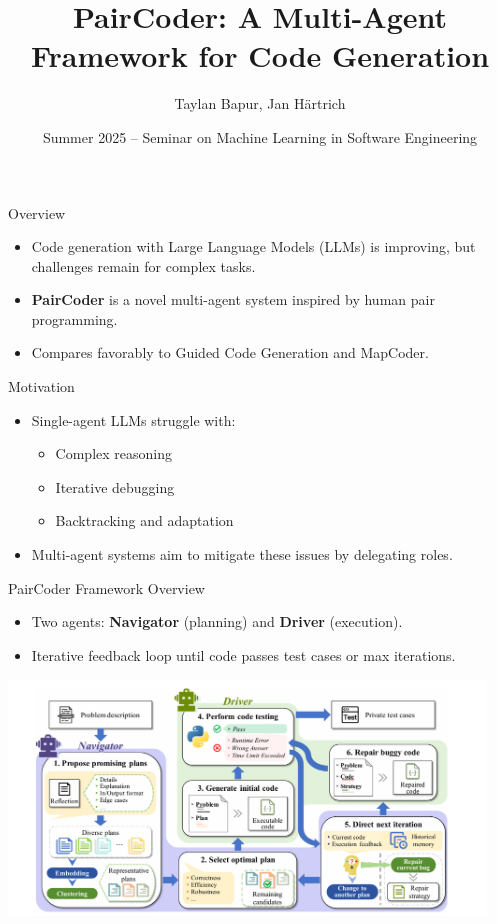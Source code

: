 \documentclass{beamer}
\title{PairCoder: A Multi-Agent Framework for Code Generation}
\author{Taylan Bapur, Jan H\"artrich}
\date{Summer 2025 -- Seminar on Machine Learning in Software Engineering}
\begin{document}
\frame{\titlepage}

\begin{frame}{Overview}
\begin{itemize}
    \item Code generation with Large Language Models (LLMs) is improving, but challenges remain for complex tasks.
    \item \textbf{PairCoder} is a novel multi-agent system inspired by human pair programming.
    \item Compares favorably to Guided Code Generation and MapCoder.
\end{itemize}
\end{frame}

\begin{frame}{Motivation}
\begin{itemize}
    \item Single-agent LLMs struggle with:
    \begin{itemize}
        \item Complex reasoning
        \item Iterative debugging
        \item Backtracking and adaptation
    \end{itemize}
    \item Multi-agent systems aim to mitigate these issues by delegating roles.
\end{itemize}
\end{frame}

\begin{frame}{PairCoder Framework Overview}
\begin{itemize}
    \item Two agents: \textbf{Navigator} (planning) and \textbf{Driver} (execution).
    \item Iterative feedback loop until code passes test cases or max iterations.
\end{itemize}
\begin{center}
    \includegraphics[width=0.95\textwidth]{paircoder-architecture.png}
\end{center}
\end{frame}
\end{document}
